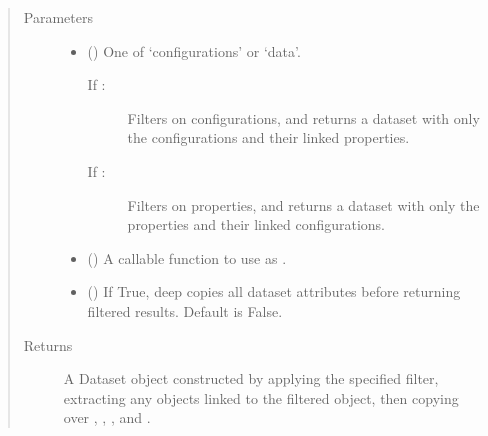 \documentclass[letterpaper,10pt,english]{sphinxmanual}
\begin{document}
\begin{fulllineitems}
\begin{fulllineitems}
\begin{sphinxVerbatim}[commandchars=\\\{\}]
  
      \PYG{p}{[}\PYG{p}{]}\PYG{p}{[}\PYG{p}{]}  
\end{sphinxVerbatim}
\begin{quote}\begin{description}
\item[{Parameters}] \leavevmode\begin{itemize}
\item {} 
\sphinxAtStartPar
{} () \textendash{} 
\sphinxAtStartPar
One of ‘configurations’ or ‘data’.
\begin{description}
\item[{If :}] \leavevmode
\sphinxAtStartPar
Filters on configurations, and returns a dataset with only
the configurations and their linked properties.

\item[{If :}] \leavevmode
\sphinxAtStartPar
Filters on properties, and returns a dataset with only the
properties and their linked configurations.

\end{description}


\item {} 
\sphinxAtStartPar
{} () \textendash{} A callable function to use as .

\item {} 
\sphinxAtStartPar
{} () \textendash{} If True, deep copies all dataset attributes before returning
filtered results. Default is False.

\end{itemize}

\item[{Returns}] \leavevmode
\sphinxAtStartPar
A Dataset object constructed by applying the specified filter,
extracting any objects linked to the filtered object, then
copying over , ,
, and .


\end{description}
\end{quote}
\end{fulllineitems}
\end{fulllineitems}
\end{document}
